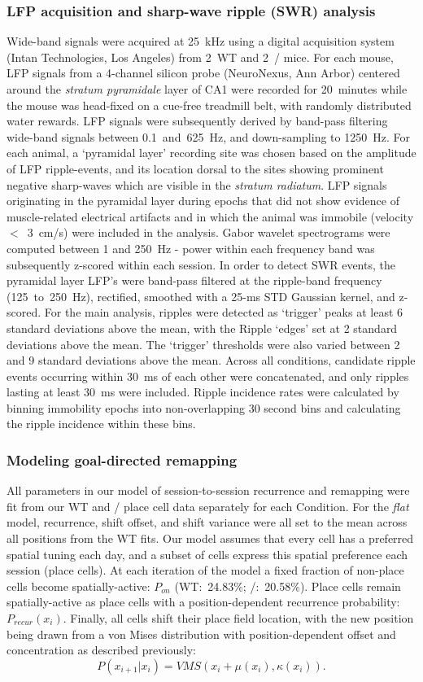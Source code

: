 \subsubsection{LFP acquisition and sharp-wave ripple (SWR) analysis}
Wide-band signals were acquired at 25~kHz using a digital acquisition system (Intan Technologies, Los Angeles) from 2~WT and 2~\df/ mice. For each mouse, LFP signals from a 4-channel silicon probe (NeuroNexus, Ann Arbor) centered around the \emph{stratum pyramidale} layer of CA1 were recorded for 20~minutes while the mouse was head-fixed on a cue-free treadmill belt, with randomly distributed water rewards. LFP signals were subsequently derived by band-pass filtering wide-band signals between 0.1~and~625~Hz, and down-sampling to 1250~Hz. For each animal, a `pyramidal layer' recording site was chosen based on the amplitude of LFP ripple-events, and its location dorsal to the sites showing prominent negative sharp-waves which are visible in the \emph{stratum radiatum}. LFP signals originating in the pyramidal layer during epochs that did not show evidence of muscle-related electrical artifacts and in which the animal was immobile (velocity $<$~3~cm/s) were included in the analysis. Gabor wavelet spectrograms were computed between 1 and 250~Hz - power within each frequency band was subsequently z-scored within each session. In order to detect SWR events, the pyramidal layer LFP's were band-pass filtered at the ripple-band frequency (125~to~250~Hz), rectified, smoothed with a 25-ms STD Gaussian kernel, and z-scored. For the main analysis, ripples were detected as `trigger' peaks at least 6 standard deviations above the mean, with the Ripple `edges' set at 2 standard deviations above the mean. The `trigger' thresholds were also varied between 2 and 9 standard deviations above the mean. Across all conditions, candidate ripple events occurring within 30~ms of each other were concatenated, and only ripples lasting at least 30~ms were included. Ripple incidence rates were calculated by binning immobility epochs into non-overlapping 30 second bins and calculating the ripple incidence within these bins.

\subsubsection{Modeling goal-directed remapping}
All parameters in our model of session-to-session recurrence and remapping were fit from our WT and \df/ place cell data separately for each Condition. For the \emph{flat} model, recurrence, shift offset, and shift variance were all set to the mean across all positions from the WT fits. Our model assumes that every cell has a preferred spatial tuning each day, and a subset of cells express this spatial preference each session (place cells). At each iteration of the model a fixed fraction of non-place cells become spatially-active: $P_{on}$ (WT:~24.83$\%$; \df/:~20.58$\%$). Place cells remain spatially-active as place cells with a position-dependent recurrence probability: $P_{recur}(x_i)$. Finally, all cells shift their place field location, with the new position being drawn from a von Mises distribution with position-dependent offset and concentration as described previously:
$$P(x_{i+1}|x_i) = VMS(x_i + \mu(x_i), \kappa(x_i)).$$

